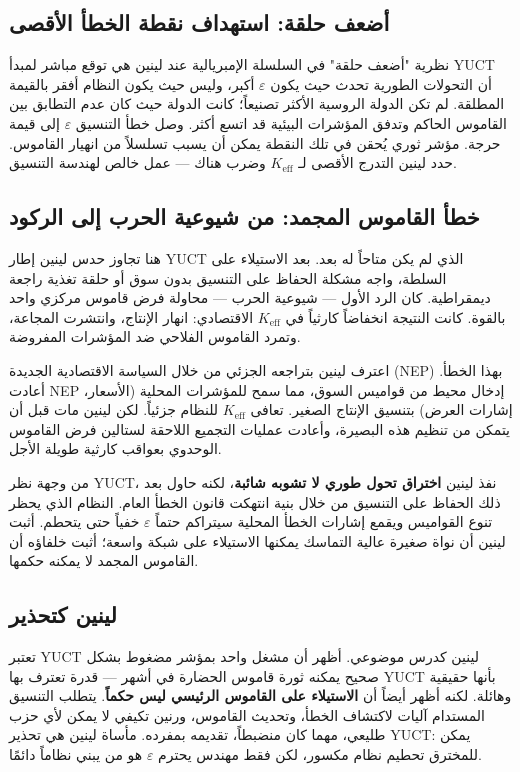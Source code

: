 \documentclass[12pt,a4paper]{article}
\newcommand{\Keff}{K_{\mathrm{eff}}}
\begin{document}
	\subsection{أضعف حلقة: استهداف نقطة الخطأ الأقصى}
	
	نظرية "أضعف حلقة" في السلسلة الإمبريالية عند لينين هي توقع مباشر لمبدأ YUCT أن التحولات الطورية تحدث حيث يكون \(\varepsilon\) أكبر، وليس حيث يكون النظام أفقر بالقيمة المطلقة. لم تكن الدولة الروسية الأكثر تصنيعاً؛ كانت الدولة حيث كان عدم التطابق بين القاموس الحاكم وتدفق المؤشرات البيئية قد اتسع أكثر. وصل خطأ التنسيق \(\varepsilon\) إلى قيمة حرجة. مؤشر ثوري يُحقن في تلك النقطة يمكن أن يسبب تسلسلاً من انهيار القاموس. حدد لينين التدرج الأقصى لـ \(\Keff\) وضرب هناك — عمل خالص لهندسة التنسيق.
	
	\subsection{خطأ القاموس المجمد: من شيوعية الحرب إلى الركود}
	
	هنا تجاوز حدس لينين إطار YUCT الذي لم يكن متاحاً له بعد. بعد الاستيلاء على السلطة، واجه مشكلة الحفاظ على التنسيق بدون سوق أو حلقة تغذية راجعة ديمقراطية. كان الرد الأول — شيوعية الحرب — محاولة فرض قاموس مركزي واحد بالقوة. كانت النتيجة انخفاضاً كارثياً في \(\Keff\) الاقتصادي: انهار الإنتاج، وانتشرت المجاعة، وتمرد القاموس الفلاحي ضد المؤشرات المفروضة.
	
	اعترف لينين بتراجعه الجزئي من خلال السياسة الاقتصادية الجديدة (NEP) بهذا الخطأ. أعادت NEP إدخال محيط من قواميس السوق، مما سمح للمؤشرات المحلية (الأسعار، إشارات العرض) بتنسيق الإنتاج الصغير. تعافى \(\Keff\) للنظام جزئياً. لكن لينين مات قبل أن يتمكن من تنظيم هذه البصيرة، وأعادت عمليات التجميع اللاحقة لستالين فرض القاموس الوحدوي بعواقب كارثية طويلة الأجل.
	
	من وجهة نظر YUCT، نفذ لينين \textbf{اختراق تحول طوري لا تشوبه شائبة}، لكنه حاول بعد ذلك الحفاظ على التنسيق من خلال بنية انتهكت قانون الخطأ العام. النظام الذي يحظر تنوع القواميس ويقمع إشارات الخطأ المحلية سيتراكم حتماً \(\varepsilon\) خفياً حتى يتحطم. أثبت لينين أن نواة صغيرة عالية التماسك يمكنها الاستيلاء على شبكة واسعة؛ أثبت خلفاؤه أن القاموس المجمد لا يمكنه حكمها.
	
	\subsection{لينين كتحذير}
	
	تعتبر YUCT لينين كدرس موضوعي. أظهر أن مشغل واحد بمؤشر مضغوط بشكل صحيح يمكنه ثورة قاموس الحضارة في أشهر — قدرة تعترف بها YUCT بأنها حقيقية وهائلة. لكنه أظهر أيضاً أن \textbf{الاستيلاء على القاموس الرئيسي ليس حكماً}. يتطلب التنسيق المستدام آليات لاكتشاف الخطأ، وتحديث القاموس، ورنين تكيفي لا يمكن لأي حزب طليعي، مهما كان منضبطاً، تقديمه بمفرده. مأساة لينين هي تحذير YUCT: يمكن للمخترق تحطيم نظام مكسور، لكن فقط مهندس يحترم \(\varepsilon\) هو من يبني نظاماً دائمًا.
	
\end{document}
